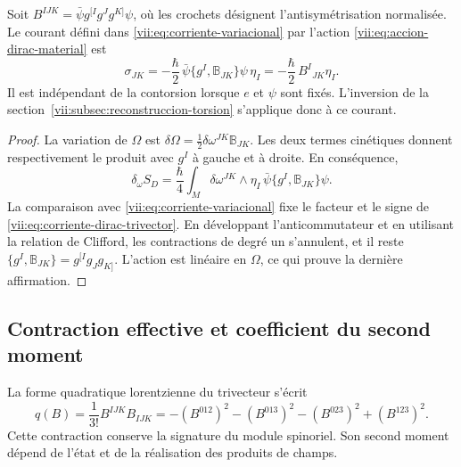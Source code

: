 \begin{proposition}
\label{vii:prop:corriente-dirac-explicita}
Soit
\(B^{IJK}=\bar\psi g^{[I}g^Jg^{K]}\psi\), où les crochets
désignent l'antisymétrisation normalisée. Le courant défini dans
\eqref{vii:eq:corriente-variacional} par l'action
\eqref{vii:eq:accion-dirac-material} est
\begin{equation}
 \sigma_{JK}
 =-\frac{\hbar}{2}\,
   \bar\psi\{g^I,\mathbb B_{JK}\}\psi\,\eta_I
 =-\frac{\hbar}{2}\,B^I{}_{JK}\eta_I.
 \label{vii:eq:corriente-dirac-trivector}
\end{equation}
Il est indépendant de la contorsion lorsque \(e\) et \(\psi\) sont
fixés. L'inversion de la section~\ref{vii:subsec:reconstruccion-torsion}
s'applique donc à ce courant.
\end{proposition}
\begin{proof}
La variation de \(\Omega\) est \(\delta\Omega=\frac12\delta\omega^{JK}\mathbb B_{JK}\). Les deux termes cinétiques donnent respectivement le produit avec \(g^I\) à gauche et à droite. En conséquence,
\[
 \delta_\omega S_D
 =\frac{\hbar}{4}\int_M\delta\omega^{JK}\wedge\eta_I\,
                 \bar\psi\{g^I,\mathbb B_{JK}\}\psi.
\]
La comparaison avec \eqref{vii:eq:corriente-variacional} fixe le
facteur et le signe de \eqref{vii:eq:corriente-dirac-trivector}.
En développant l'anticommutateur et en utilisant la relation de Clifford,
les contractions de degré un s'annulent, et il reste
\(\{g^I,\mathbb B_{JK}\}=g^{[I}g_Jg_{K]}\).
L'action est linéaire en \(\Omega\), ce qui prouve la dernière
affirmation.
\end{proof}

\subsection{Contraction effective et coefficient du second moment}
\label{vii:subsec:contraccion-espinorial}

La forme quadratique lorentzienne du trivecteur s'écrit
\begin{equation}
 q(B)=\frac1{3!}B^{IJK}B_{IJK}
 =-(B^{012})^2-(B^{013})^2-(B^{023})^2+(B^{123})^2.
 \label{vii:eq:cuadratica-trivector}
\end{equation}
Cette contraction conserve la signature du module spinoriel. Son second moment dépend de l'état et de la réalisation des produits de champs.

